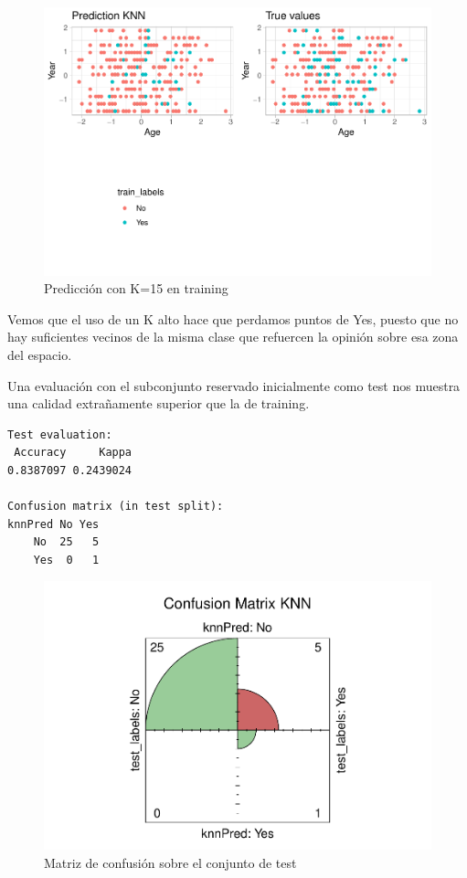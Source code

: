 \begin{figure}[H]\center\includegraphics[width=.9\linewidth]{img/Clasificacion_files/figure-latex/unnamed-chunk-10-1}\caption{Predicción con K=15 en training}\end{figure}

Vemos que el uso de un K alto hace que perdamos puntos de Yes, puesto que no hay suficientes vecinos de la misma clase que refuercen la opinión sobre esa zona del espacio.

\vspace{\baselineskip}

Una evaluación con el subconjunto reservado inicialmente como test nos muestra una calidad extrañamente superior que la de training.

\begin{verbatim}
Test evaluation:
 Accuracy     Kappa 
0.8387097 0.2439024 

Confusion matrix (in test split):
knnPred No Yes
    No  25   5
    Yes  0   1
\end{verbatim}

\begin{figure}[H]\center\includegraphics[width=.9\linewidth]{img/Clasificacion_files/figure-latex/unnamed-chunk-9-1}\caption{Matriz de confusión sobre el conjunto de test}\end{figure}

